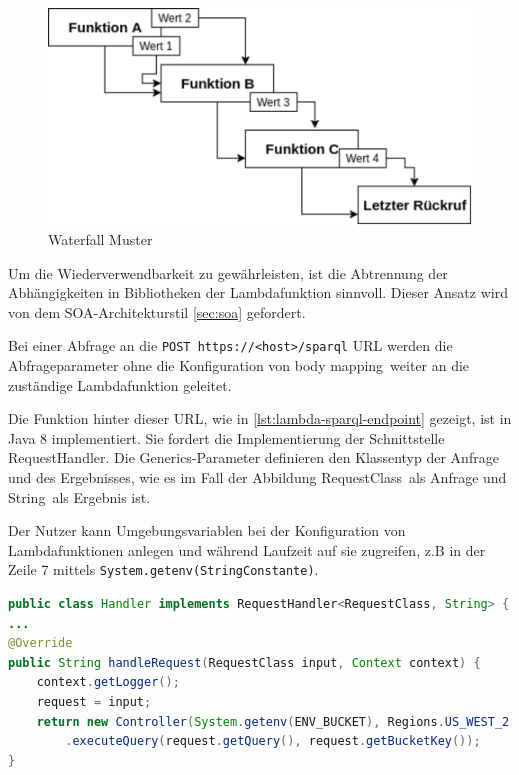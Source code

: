 \documentclass[
12pt,
english,
ngerman,
headsepline,
twoside,
openright,
numbers=noenddot,version=first
]{scrreprt}
\begin{document}
\begin{figure}[H]
	\begin{center}
	\includegraphics[scale=0.6]{./pics/aws/pattern-waterfall.eps}
	\caption{Waterfall Muster}
	\label{pic:waterfall}
	\end{center}
\end{figure}

Um die Wiederverwendbarkeit zu gewährleisten, ist die Abtrennung der Abhängigkeiten in Bibliotheken der Lambdafunktion sinnvoll. Dieser Ansatz wird von dem \acrshort{SOA}-Architekturstil \autoref{sec:soa} gefordert.


Bei einer Abfrage an die \lstinline|POST https://<host>/sparql| \acrshort{URL} werden die Abfrageparameter ohne die Konfiguration von \glqq body mapping\grqq\ weiter an die zuständige Lambdafunktion geleitet.

Die Funktion hinter dieser \acrshort{URL}, wie in  \autoref{lst:lambda-sparql-endpoint} gezeigt, ist in Java 8 implementiert. Sie fordert die Implementierung der Schnittstelle RequestHandler. Die Generics-Parameter definieren den Klassentyp der Anfrage und des Ergebnisses, wie es im Fall der Abbildung \glqq RequestClass\grqq\ als Anfrage und \glqq String\grqq\ als Ergebnis ist. 

Der Nutzer kann Umgebungsvariablen\label{lambda-env} bei der Konfiguration von Lambdafunktionen anlegen und während Laufzeit auf sie zugreifen, z.B in der Zeile 7 mittels \lstinline|System.getenv(StringConstante)|.

\begin{lstlisting}[language=Java,caption={Lambda Sparql-Endpoint},label={lst:lambda-sparql-endpoint}]
public class Handler implements RequestHandler<RequestClass, String> {
...
@Override
public String handleRequest(RequestClass input, Context context) {
	context.getLogger();
	request = input;
	return new Controller(System.getenv(ENV_BUCKET), Regions.US_WEST_2.getName())
		.executeQuery(request.getQuery(), request.getBucketKey());
}
\end{lstlisting}
\end{document}
